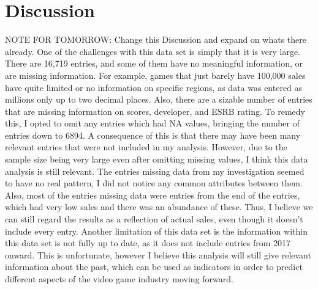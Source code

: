 \documentclass[12pt]{article}
\begin{document}
\section{Discussion}
\label{sec:disc}
NOTE FOR TOMORROW: Change this Discussion and expand on whats there already.
One of the challenges with this data set is simply that it is very large. There are 16,719 entries, and some of them have no meaningful 
information, or are missing information. For example, games that just barely have 100,000 sales have quite limited or no information on 
specific regions, as data was entered as millions only up to two decimal places. Also, there are a sizable number of entries that are 
missing information on scores, developer, and ESRB rating. 
To remedy this, I opted to omit any entries which had NA values, bringing the number of entries down to 6894. 
A consequence of this is that there may have been many relevant entries that were not included in my analysis.
However, due to the sample size being very large even after omitting missing values, I think this data analysis is still relevant.
The entries missing data from my investigation seemed to have no real pattern, I did not notice any common attributes between them.
Also, most of the entries missing data were entries from the end of the entries, which had very low sales and there was an abundance of these.
Thus, I believe we can still regard the results as a reflection of actual sales, even though it doesn't include every entry.
Another limitation of this data set is the information within this data set is not fully up to date, as it does not include entries from 2017 
onward. This is unfortunate, however I believe this analysis will still give relevant information about the past, which can be used as 
indicators in order to predict different aspects of the video game industry moving forward.




\end{document}
